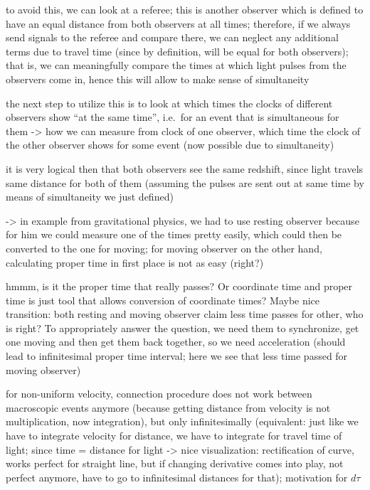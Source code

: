 to avoid this, we can look at a referee; this is another observer which is defined to have an equal distance from both observers at all times; therefore, if we always send signals to the referee and compare there, we can neglect any additional terms due to travel time (since by definition, will be equal for both observers); that is, we can meaningfully compare the times at which light pulses from the observers come in, hence this will allow to make sense of simultaneity

the next step to utilize this is to look at which times the clocks of different observers show \enquote{at the same time}, i.e.~for an event that is simultaneous for them -> how we can measure from clock of one observer, which time the clock of the other observer shows for some event (now possible due to simultaneity)


it is very logical then that both observers see the same redshift, since light travels same distance for both of them (assuming the pulses are sent out at same time by means of simultaneity we just defined)

-> in example from gravitational physics, we had to use resting observer because for him we could measure one of the times pretty easily, which could then be converted to the one for moving; for moving observer on the other hand, calculating proper time in first place is not as easy (right?)



hmmm, is it the proper time that really passes? Or coordinate time and proper time is just tool that allows conversion of coordinate times? Maybe nice transition: both resting and moving observer claim less time passes for other, who is right? To appropriately answer the question, we need them to synchronize, get one moving and then get them back together, so we need acceleration (should lead to infinitesimal proper time interval; here we see that less time passed for moving observer)


for non-uniform velocity, connection procedure does not work between macroscopic events anymore (because getting distance from velocity is not multiplication, now integration), but only infinitesimally (equivalent: just like we have to integrate velocity for distance, we have to integrate for travel time of light; since time = distance for light -> nice visualization: rectification of curve, works perfect for straight line, but if changing derivative comes into play, not perfect anymore, have to go to infinitesimal distances for that); motivation for $d\tau$


